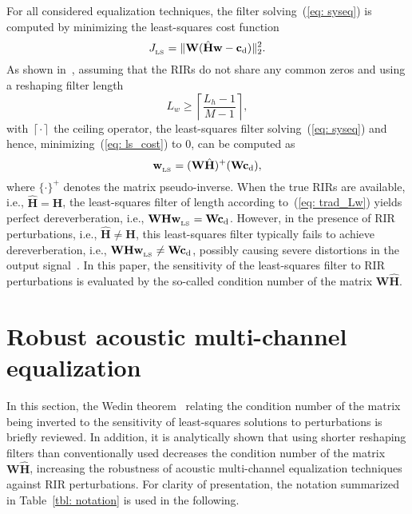 \documentclass[twocolumn]{bmcart}%
\begin{document}
For all considered equalization techniques, the filter solving~(\ref{eq: syseq}) is computed by minimizing the least-squares cost function
\begin{equation}
\label{eq: ls_cost}
J_{_{\text{LS}}} = \|\mathbf{W} (\hat{\mathbf{H}}\mathbf{w} - \mathbf{c}_{\rm d}) \|_2^2.
\end{equation} 
As shown in~\cite{Miyoshi_ITASS_1988,Lim_ITASLP_2014,Kodrasi_ITASLP_2013}, assuming that the RIRs do not share any common zeros and using a reshaping filter length 
\begin{equation}
\label{eq: trad_Lw}
L_w \geq \left\lceil{\frac{L_h-1}{M-1}}\right\rceil,
\end{equation} 
with $\left\lceil{\cdot}\right\rceil$ the ceiling operator, the least-squares filter solving~(\ref{eq: syseq}) and hence, minimizing~(\ref{eq: ls_cost}) to $0$, can be computed as~\cite{Miyoshi_ITASS_1988, Lim_ITASLP_2014, Kodrasi_ITASLP_2013}
\begin{equation}
\label{eq: w_ls}
\mathbf{w}_{_{\text{LS}}} = (\mathbf{W}\hat{\mathbf{H}})^+(\mathbf{W}\mathbf{c}_{\rm d}),
\end{equation}
where $\{ \cdot \}^+$ denotes the matrix pseudo-inverse. 
When the true RIRs are available, i.e., $\hat{\mathbf{H}} = \mathbf{H}$, the least-squares filter of length according to~(\ref{eq: trad_Lw}) yields perfect dereverberation, i.e., $\mathbf{W}\mathbf{H}\mathbf{w}_{_{\text{LS}}} = \mathbf{W}\mathbf{c}_{\rm d}$.
However, in the presence of RIR perturbations, i.e., $\hat{\mathbf{H}} \neq \mathbf{H}$, this least-squares filter typically fails to achieve dereverberation, i.e., $\mathbf{W}\mathbf{H}\mathbf{w}_{_{\text{LS}}} \neq \mathbf{W}\mathbf{c}_{\rm d}$, possibly causing severe distortions in the output signal~\cite{Kodrasi_ITASLP_2013}.
In this paper, the sensitivity of the least-squares filter to RIR perturbations is evaluated by the so-called condition number of the matrix $\mathbf{W}\hat{\mathbf{H}}$.

\section{Robust acoustic multi-channel equalization}
\label{sec: cond_no}
In this section, the Wedin theorem~\cite{Wedin_1973} relating the condition number of the matrix being inverted to the sensitivity of least-squares solutions to perturbations is briefly reviewed.
In addition, it is analytically shown that using shorter reshaping filters than conventionally used decreases the condition number of the matrix $\mathbf{W}\hat{\mathbf{H}}$, increasing the robustness of acoustic multi-channel equalization techniques against RIR perturbations.
For clarity of presentation, the notation summarized in Table~\ref{tbl: notation} is used in the following.
\end{document}

